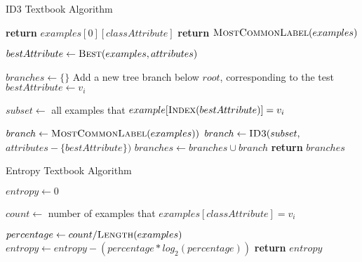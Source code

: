 \begin{algorithm}[H]
\caption{ID3 Textbook Algorithm }\label{a:id3-simple}
\begin{algorithmic}[1]
        \State \textbf{return} $examples[0][classAttribute]$
        \State \textbf{return} $\textsc{MostCommonLabel}(examples)$
    \EndIf

    \State $bestAttribute \gets \textsc{Best}(examples, attributes)$
    
    \State $branches \gets \{\}$
        \State Add a new tree branch below $root$, corresponding to the test $bestAttribute \gets v_i$

        \State $subset \gets$ all examples that $example[\textsc{Index}(bestAttribute)] = v_i$
        
            \State $branch \gets \textsc{MostCommonLabel}(examples))$
        \Else
            \State $branch \gets \textsc{ID3}(subset,$ $attributes - \{bestAttribute\})$
        \EndIf
        \State $branches \gets branches \cup branch$
    \EndFor
    \State \textbf{return} $branches$
\EndProcedure
\end{algorithmic}
\end{algorithm}


\begin{algorithm}[H]
\caption{Entropy Textbook Algorithm}\label{a:id3-Entropy-simple}
\begin{algorithmic}[1]
    \State $entropy \gets 0$
    
        \State $count \gets$ number of examples that $examples[classAttribute] = v_i$
        
        \State $percentage \gets count / \textsc{Length}(examples)$
            \State $entropy \gets entropy - (percentage * log_2 (percentage))$
        \EndIf
    \EndFor
    \State \textbf{return} $entropy$
\EndProcedure
\end{algorithmic}
\end{algorithm}


